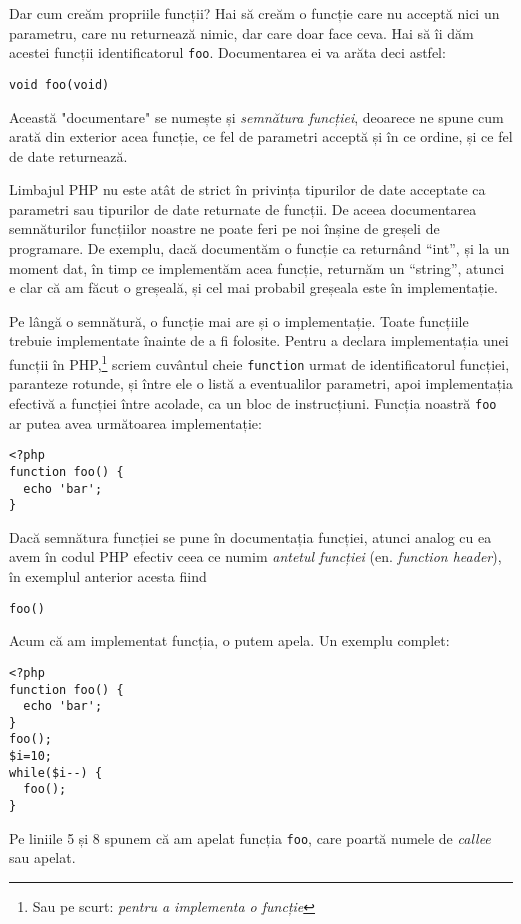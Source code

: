 Dar cum creăm propriile funcții? Hai să creăm o funcție care nu acceptă nici un
parametru, care nu returnează nimic, dar care doar face ceva. Hai să îi dăm acestei
funcții identificatorul \texttt{foo}. Documentarea ei va arăta deci astfel:
\begin{verbatim}
void foo(void)
\end{verbatim}
Această "documentare" se numește și \textsl{semnătura funcției}, deoarece
ne spune cum arată din exterior acea funcție, ce fel de parametri acceptă
și în ce ordine, și ce fel de date returnează.

Limbajul PHP nu este at\^at de strict \^in privința tipurilor de date
acceptate ca parametri sau tipurilor de date returnate de funcții. De aceea
documentarea semnăturilor funcțiilor noastre ne poate feri pe noi \^inșine
de greșeli de programare. De exemplu, dacă documentăm o funcție ca return\^and
``int'', și la un moment dat, \^in timp ce implementăm acea funcție,
returnăm un ``string'', atunci e clar că am făcut o greșeală, și cel
mai probabil greșeala este \^in implementație.





Pe lângă o semnătură, o funcție mai are și o implementație. Toate funcțiile
trebuie implementate înainte de a fi folosite. Pentru a declara
implementația unei funcții în PHP,\footnote{Sau pe scurt: \textit{pentru
a implementa o funcție}}
scriem cuvântul cheie \texttt{function} urmat de identificatorul funcției,
paranteze rotunde, și între ele o listă a eventualilor parametri,
apoi implementația efectivă a funcției între acolade, ca un bloc
de instrucțiuni. Funcția
noastră \texttt{foo} ar putea avea următoarea implementație:
\begin{lstlisting}
<?php
function foo() {
  echo 'bar';
}
\end{lstlisting}
Dacă semnătura funcției se pune \^in documentația funcției, atunci analog cu ea
avem \^in codul PHP efectiv ceea ce numim \textsl{antetul funcției} (en. \textsl{function header}),
\^in exemplul anterior acesta fiind
\begin{verbatim}
foo()
\end{verbatim}


Acum că am implementat funcția, o putem apela. Un exemplu complet:
\begin{lstlisting}
<?php
function foo() {
  echo 'bar';
}
foo();
$i=10;
while($i--) {
  foo();
}
\end{lstlisting}
Pe liniile 5 și 8 spunem că am apelat funcția \texttt{foo}, care poartă numele
de \textsl{callee} sau apelat.

